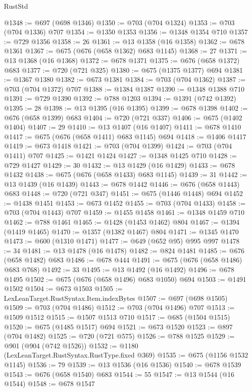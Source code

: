 \begin{lexlean}{RustStd}
\begin{coremodule}
{\begin{coremodule}
{{{{{{{{{{{{@1348 := @697 (@698 @1346)
@1350 := @703 (@704 @1324)
@1353 := @703 (@704 @1336) @707
@1354 := @1350 @1353
@1356 := @1348 @1354 @710
@1357 := @729 @1356
@1358 := 26
@1361 := @13 @1358 (@16 @1358)
@1362 := @678 @1361
@1367 := @675 (@676 (@658 @1362) @683 @1145)
@1368 := 27
@1371 := @13 @1368 (@16 @1368)
@1372 := @678 @1371
@1375 := @676 (@658 @1372) @683
@1377 := @720 (@721 @325)
@1380 := @675 (@1375 @1377) @694
@1381 := @1367 @1380
@1382 := @673 @1381
@1384 := @703 (@704 @1362)
@1387 := @703 (@704 @1372) @707
@1388 := @1384 @1387
@1390 := @1348 @1388 @710
@1391 := @729 @1390
@1392 := @788 @1203
@1394 := @1391 (@742 @1392)
@1395 := 28
@1398 := @13 @1395 (@16 @1395)
@1399 := @678 @1398
@1402 := @676 (@658 @1399) @683
@1404 := @720 (@721 @337)
@1406 := @675 (@1402 @1404)
@1407 := 29
@1410 := @13 @1407 (@16 @1407)
@1411 := @678 @1410
@1417 := @675 (@676 (@658 @1411) @683 @1145) @694
@1418 := @1406 @1417
@1419 := @673 @1418
@1421 := @703 (@704 @1399)
@1424 := @703 (@704 @1411) @707
@1425 := @1421 @1424
@1427 := @1348 @1425 @710
@1428 := @729 @1427
@1429 := 30
@1432 := @13 @1429 (@16 @1429)
@1433 := @678 @1432
@1438 := @675 (@676 (@658 @1433) @683 @1145)
@1439 := 31
@1442 := @13 @1439 (@16 @1439)
@1443 := @678 @1442
@1446 := @676 (@658 @1443) @683
@1448 := @720 (@721 @347)
@1451 := @675 (@1446 @1448) @694
@1452 := @1438 @1451
@1453 := @673 @1452
@1455 := @703 (@704 @1433)
@1458 := @703 (@704 @1443) @707
@1459 := @1455 @1458
@1461 := @1348 @1459 @710
@1462 := @788 @1461
@1465 := @1428 (@1453 @1462) @804
@1467 := @1394 (@1419 @1465)
@1470 := @1357 (@1382 @1467) @804
@1471 := @1345 @1470
@1473 := @600 (@1310 @1471)
@1477 := @649 (@652 @95) @995 @997
@1478 := 34
@1481 := @13 @1478 (@16 @1478)
@1482 := @824 @1481
@1485 := @676 (@658 @1482) @683
@1486 := @678 @444
@1491 := @675 (@676 (@658 @1486) @683 @768)
@1492 := 33
@1495 := @13 @1492 (@16 @1492)
@1496 := @678 @1495
@1502 := @675 (@676 (@658 @1496) @683 @1050) @694
@1503 := @1491 @1502
@1504 := @673 @1503
@1505 := LexLeanTarget.RustSyntax.Item.indexBytes
@1507 := @697 (@698 @1505)
@1509 := @703 (@704 @1486)
@1512 := @703 (@704 @1496) @707
@1513 := @1509 @1512
@1515 := @1507 @1513 @710
@1517 := @685 (@1504 @1515)
@1520 := @675 (@1485 @1517) @694
@1521 := @673 @1520
@1523 := @897 (@704 @1482)
@1525 := @720 (@721 @575)
@1526 := @788 @1525
@1529 := @901 (@904 (@742 @1526))
@1532 := @1180 (LexLeanTarget.RustSyntax.RustType.fixed @369)
@1535 := @675 (@1156 @1532 @1145)
@1536 := 79
@1539 := @13 @1536 (@16 @1536)
@1540 := @678 @1539
@1543 := @676 (@658 @1540) @683
@1544 := 55
@1547 := @13 @1544 (@16 @1544)
@1548 := @678 @1547
}}}}}}}}}}}}
\end{coremodule}}
\end{coremodule}
\end{lexlean}
